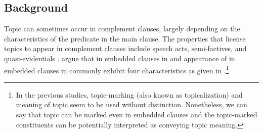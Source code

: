 



\subsection{Background}
\label{10:ssec:embedded:background}




Topic can sometimes occur in complement clauses,
largely depending on the characteristics of the predicate in the main
clause.  The properties that license topics to appear in complement
clauses include speech acts, semi-factives, and quasi-evidentials
\citep{roberts:11}.  \citet{maki:etal:99} argue that 
 in embedded clauses in  and appearance of \wa in
embedded clauses in  commonly exhibit four
characteristics as given in .\footnote{In the previous
  studies, topic-marking (also known as topicalization) and meaning of topic
  seem to be used without distinction. Nonetheless, we can say that
  topic can be marked even in embedded clauses and the topic-marked
  constituents can be potentially interpreted as conveying topic
  meaning.}



